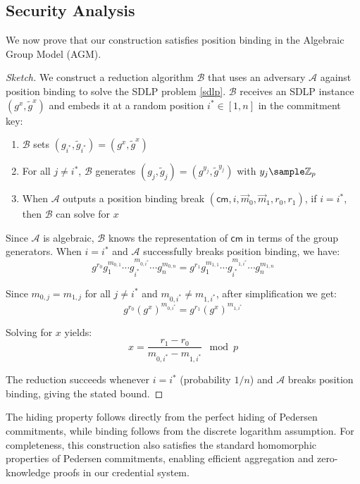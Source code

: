 \subsection{Security Analysis}

We now prove that our construction satisfies position binding in the Algebraic Group Model (AGM).

\begin{proof}[Sketch]
We construct a reduction algorithm $\mathcal{B}$ that uses an adversary $\mathcal{A}$ against position binding to solve the SDLP problem \ref{sdlp}. $\mathcal{B}$ receives an SDLP instance $(g^x, \tilde{g}^x)$ and embeds it at a random position $i^* \in [1,n]$ in the commitment key:

\begin{enumerate}
    \item $\mathcal{B}$ sets $(g_{i^*}, \tilde{g}_{i^*}) = (g^x, \tilde{g}^x)$
    \item For all $j \neq i^*$, $\mathcal{B}$ generates $(g_j, \tilde{g}_j) = (g^{y_j}, \tilde{g}^{y_j})$ with $y_j \sample \Z_p$
    \item When $\mathcal{A}$ outputs a position binding break $(\mathsf{cm}, i, \vec{m}_0, \vec{m}_1, r_0, r_1)$, if $i = i^*$, then $\mathcal{B}$ can solve for $x$
\end{enumerate}

Since $\mathcal{A}$ is algebraic, $\mathcal{B}$ knows the representation of $\mathsf{cm}$ in terms of the group generators. When $i = i^*$ and $\mathcal{A}$ successfully breaks position binding, we have:
\[
    g^{r_0}g_1^{m_{0,1}}\cdots g_{i^*}^{m_{0,i^*}}\cdots g_n^{m_{0,n}} = g^{r_1}g_1^{m_{1,1}}\cdots g_{i^*}^{m_{1,i^*}}\cdots g_n^{m_{1,n}}
\]

Since $m_{0,j} = m_{1,j}$ for all $j \neq i^*$ and $m_{0,i^*} \neq m_{1,i^*}$, after simplification we get:
\[
    g^{r_0} (g^x)^{m_{0,i^*}} = g^{r_1} (g^x)^{m_{1,i^*}}
\]

Solving for $x$ yields:
\[
    x = \frac{r_1 - r_0}{m_{0,i^*} - m_{1,i^*}} \mod p
\]

The reduction succeeds whenever $i = i^*$ (probability $1/n$) and $\mathcal{A}$ breaks position binding, giving the stated bound.
\end{proof}

The hiding property follows directly from the perfect hiding of Pedersen commitments, while binding follows from the discrete logarithm assumption. For completeness, this construction also satisfies the standard homomorphic properties of Pedersen commitments, enabling efficient aggregation and zero-knowledge proofs in our credential system.

